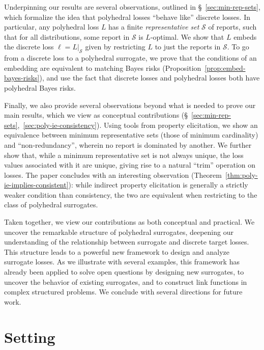 \documentclass[twoside,11pt]{article}
\newcommand{\Sc}{\mathcal{S}}
\begin{document}
Underpinning our results are several observations, outlined in \S~\ref{sec:min-rep-sets}, which formalize the idea that polyhedral losses ``behave like'' discrete losses.
In particular, any polyhedral loss $L$ has a finite \emph{representative set} $\Sc$ of reports, such that for all distributions, some report in $\Sc$ is $L$-optimal.
We show that $L$ embeds the discrete loss $\ell = L|_\Sc$ given by restricting $L$ to just the reports in $\Sc$.
To go from a discrete loss to a polyhedral surrogate, we prove that the conditions of an embedding are equivalent to matching Bayes risks (Proposition~\ref{prop:embed-bayes-risks}), and use the fact that discrete losses and polyhedral losses both have polyhedral Bayes risks.

Finally, we also provide several observations beyond what is needed to prove our main results, which we view as conceptual contributions (\S~\ref{sec:min-rep-sets},~\ref{sec:poly-ie-consistency}).
Using tools from property elicitation, we show an equivalence between minimum representative sets (those of minimum cardinality) and ``non-redundancy'', wherein no report is dominated by another.
We further show that, while a minimum representative set is not always unique, the loss values associated with it are unique, giving rise to a natural ``trim'' operation on losses.
The paper concludes with an interesting observation (Theorem~\ref{thm:poly-ie-implies-consistent}): while indirect property elicitation is generally a strictly weaker condition than consistency, the two are equivalent when restricting to the class of polyhedral surrogates.

Taken together, we view our contributions as both conceptual and practical.
We uncover the remarkable structure of polyhedral surrogates, deepening our understanding of the relationship between surrogate and discrete target losses.
This structure leads to a powerful new framework to design and analyze surrogate losses.
As we illustrate with several examples, this framework has already been applied to solve open questions by designing new surrogates, to uncover the behavior of existing surrogates, and to construct link functions in complex structured problems.
We conclude with several directions for future work.





\section{Setting}
\label{sec:setting}
\end{document}
